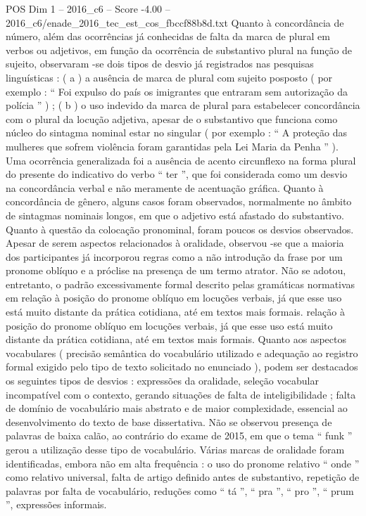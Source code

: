 \begin{textsample}{POS Dim 1 – 2016\_c6 – Score -4.00 – 2016\_c6/enade\_2016\_tec\_est\_cos\_fbccf88b8d.txt}
Quanto à concordância de número, além das ocorrências já conhecidas de falta da marca de plural em verbos ou adjetivos, em função da ocorrência de substantivo plural na função de sujeito, observaram -se dois tipos de desvio já registrados nas pesquisas linguísticas : ( a ) a ausência de marca de plural com sujeito posposto ( por exemplo : “ Foi expulso do país os imigrantes que entraram sem autorização da polícia ” ) ; ( b ) o uso indevido da marca de plural para estabelecer concordância com o plural da locução adjetiva, apesar de o substantivo que funciona como núcleo do sintagma nominal estar no singular ( por exemplo : “ A proteção das mulheres que sofrem violência foram garantidas pela Lei Maria da Penha ” ).
Uma ocorrência generalizada foi a ausência de acento circunflexo na forma plural do presente do indicativo do verbo “ ter ”, que foi considerada como um desvio na concordância verbal e não meramente de acentuação gráfica.
Quanto à concordância de gênero, alguns casos foram observados, normalmente no âmbito de sintagmas nominais longos, em que o adjetivo está afastado do substantivo.
Quanto à questão da colocação pronominal, foram poucos os desvios observados.
Apesar de serem aspectos relacionados à oralidade, observou -se que a maioria dos participantes já incorporou regras como a não introdução da frase por um pronome oblíquo e a próclise na presença de um termo atrator.
Não se adotou, entretanto, o padrão excessivamente formal descrito pelas gramáticas normativas em relação à posição do pronome oblíquo em locuções verbais, já que esse uso está muito distante da prática cotidiana, até em textos mais formais. relação à posição do pronome oblíquo em locuções verbais, já que esse uso está muito distante da prática cotidiana, até em textos mais formais.
Quanto aos aspectos vocabulares ( precisão semântica do vocabulário utilizado e adequação ao registro formal exigido pelo tipo de texto solicitado no enunciado ), podem ser destacados os seguintes tipos de desvios : expressões da oralidade, seleção vocabular incompatível com o contexto, gerando situações de falta de inteligibilidade ; falta de domínio de vocabulário mais abstrato e de maior complexidade, essencial ao desenvolvimento do texto de base dissertativa.
Não se observou presença de palavras de baixa calão, ao contrário do exame de 2015, em que o tema “ funk ” gerou a utilização desse tipo de vocabulário.
Várias marcas de oralidade foram identificadas, embora não em alta frequência : o uso do pronome relativo “ onde ” como relativo universal, falta de artigo definido antes de substantivo, repetição de palavras por falta de vocabulário, reduções como “ tá ”, “ pra ”, “ pro ”, “ prum ”, expressões informais.

\end{textsample}
